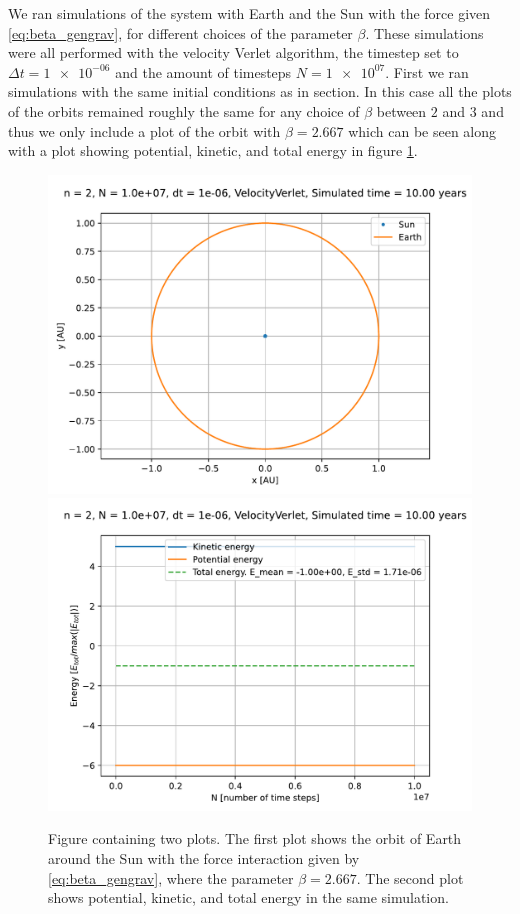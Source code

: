 \documentclass[reprint,english,notitlepage]{revtex4-1}  %
\begin{document}
We ran simulations of the system with Earth and the Sun with the force given \eqref{eq:beta_gengrav}, for different choices of the parameter $\beta$. These simulations were all performed with the velocity Verlet algorithm, the timestep set to $\Delta t = \num{1e-06}$ and the amount of timesteps $N = \num{1e+07}$. First we ran simulations with the same initial conditions as in section. In this case all the plots of the orbits remained roughly the same for any choice of $\beta$ between $2$ and $3$ and thus we only include a plot of the orbit with $\beta=2.667$ which can be seen along with a plot showing potential, kinetic, and total energy in figure \ref{fig:beta-se-orbit-energy}.


\begin{figure}[H]
\includegraphics[width=\columnwidth]{../data/figures/varyingbeta/se_beta2667_vv_orbits2D.pdf}
\includegraphics[width=\columnwidth]{../data/figures/varyingbeta/se_beta2667_vv_energy.pdf}
\caption{Figure containing two plots. The first plot shows the orbit of Earth around the Sun with the force interaction given by \eqref{eq:beta_gengrav}, where the parameter $\beta = 2.667$. The second plot shows potential, kinetic, and total energy in the same simulation.}
\label{fig:beta-se-orbit-energy}
\end{figure}
\end{document}
